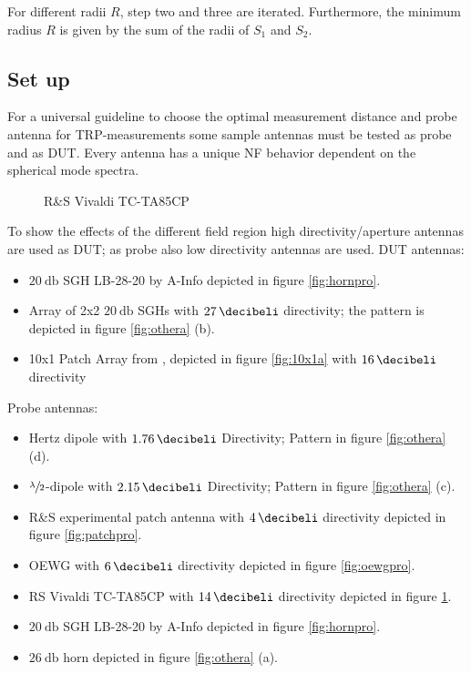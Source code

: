 For different radii $R$, step two and three are iterated. Furthermore, the minimum radius $R$ is given by the sum of the radii of $S_1$ and $S_2$.

\subsection{Set up}

For a universal guideline to choose the optimal measurement distance and probe antenna for \ac{TRP}-measurements some sample antennas must be tested as probe and as \ac{DUT}. Every antenna has a unique \ac{NF} behavior dependent on the spherical mode spectra.

\begin{figure}
  \centering
  \centering
\caption{R\&{}S Vivaldi TC-TA85CP}
\label{fig:vivpro}
\end{figure}

To show the effects of the different field region high directivity/aperture antennas are used as \ac{DUT}; as probe also low directivity antennas are used. \ac{DUT} antennas:

\begin{itemize}
\item $\SI{20}{\decibel}$ \ac{SGH} LB-28-20 by A-Info depicted in figure \ref{fig:hornpro}.
\item Array of 2x2 $\SI{20}{\decibel}$ \acp{SGH} with $\SI{27}{\decibeli}$ directivity; the pattern is depicted in figure \ref{fig:othera} (b).
\item 10x1 Patch Array from \cite{7481205}, depicted in figure \ref{fig:10x1a} with $\SI{16}{\decibeli}$ directivity
\end{itemize}

Probe antennas:

\begin{itemize}
\item Hertz dipole with $\SI{1.76}{\decibeli}$ Directivity; Pattern in figure \ref{fig:othera} (d).
\item $\sfrac{\lambda}{2}$-dipole with $\SI{2.15}{\decibeli}$ Directivity; Pattern in figure \ref{fig:othera} (c).
\item R\&{}S experimental patch antenna with $\SI{4}{\decibeli}$ directivity depicted in figure \ref{fig:patchpro}.
\item \ac{OEWG} with $\SI{6}{\decibeli}$ directivity depicted in figure \ref{fig:oewgpro}.
\item \ac{RS} Vivaldi TC-TA85CP with $\SI{14}{\decibeli}$ directivity depicted in figure \ref{fig:vivpro}.
\item $\SI{20}{\decibel}$ \ac{SGH} LB-28-20 by A-Info depicted in figure \ref{fig:hornpro}.
\item $\SI{26}{\decibel}$ horn depicted in figure \ref{fig:othera} (a).
\end{itemize}


